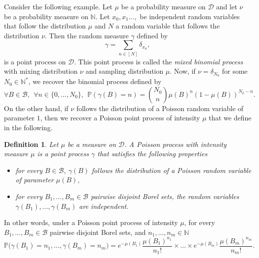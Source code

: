 \documentclass[twoside,11pt]{book}
\newtheorem{definition}{Definition}
\newtheorem{example}{Example}
\numberwithin{theorem}{chapter}
\numberwithin{definition}{chapter}
\numberwithin{proposition}{chapter}
\numberwithin{corollary}{chapter}
\numberwithin{example}{chapter}
\numberwithin{lemma}{chapter}
\numberwithin{assumption}{chapter}
\begin{document}
Consider the following example. Let $\mu$ be a probability measure on $\mathcal{D}$ and let $\nu$ be a probability measure on $\mathbb{N}$. Let $x_{0}, x_{1} \dots, $ be independent random variables that follow the distribution $\mu$ and $N$ a random variable that follows the distribution $\nu$.
Then the random measure $\gamma$ defined by
\begin{equation}
\gamma = \sum\limits_{n \in [N]} \delta_{x_{n}},
\end{equation}
is a point process on $\mathcal{D}$. This point process is called the \emph{mixed binomial process} with mixing distribution $\nu$ and sampling distribution $\mu$.
Now, if  $\nu = \delta_{N_0}$ for some $N_0 \in \mathbb{N}^{*}$, we recover the binomial process defined by
\begin{equation}\label{eq:binomial_cylinder_prb}
\forall B \in \mathcal{B}, \:\:\forall n \in \{0, \dots, N_0\}, \:\: \mathbb{P}(\gamma(B) = n) = \binom{N_0}{n}\mu(B)^{n}(1-\mu(B))^{N_0-n}.
\end{equation}
On the other hand, if $\nu$ follows the distribution of a Poisson random variable of parameter $1$, then we recover a Poisson point process of intensity $\mu$ that we define in the following.
\begin{definition}
Let $\mu$ be a measure on $\mathcal{D}$. A Poisson process with intensity measure $\mu$ is a point process $\gamma$  that satisfies the following properties
\begin{itemize}
\item for every $B \in \mathcal{B}$, $\gamma(B)$ follows the distribution of a Poisson random variable of parameter $\mu(B)$,
\item for every $B_{1}, \dots, B_{m} \in \mathcal{B}$ pairwise disjoint Borel sets, the random variables $\gamma(B_{1}), \dots, \gamma(B_{m})$ are independent. 
\end{itemize}
\end{definition}

In other words, under a Poisson point process of intensity $\mu$, for every $B_{1}, \dots, B_{m} \in \mathcal{B}$ pairwise disjoint Borel sets, and $n_{1}, \dots, n_{m} \in \mathbb{N}$
\begin{equation}\label{eq:poisson_cylinder_prb}
\mathbb{P} \Big(\gamma(B_{1}) = n_{1}, \dots, \gamma(B_{m}) = n_{m} \Big) = e^{- \mu(B_{1})}\frac{ \mu(B_{1})^{n_1}}{n_{1}!} \times \dots \times e^{- \mu(B_{m})}\frac{ \mu(B_{m})^{n_m}}{n_{m}!} .
\end{equation}
\end{document}
